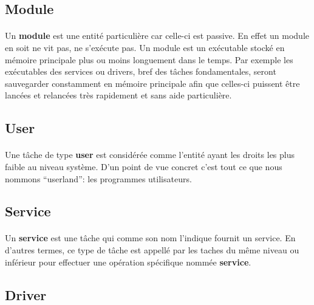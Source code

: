 \documentclass[10pt,a4wide]{article}
\begin{document}
\subsection{Module}

\paragraph{}

Un \textbf{module} est une entit\'e particuli\`ere car celle-ci est passive.
En effet un module en soit ne vit pas, ne s'ex\'ecute pas. Un module
est un ex\'ecutable stock\'e en m\'emoire principale plus ou moins longuement
dans le temps. Par exemple les ex\'ecutables des services ou drivers, bref
des t\^aches fondamentales, seront sauvegarder constamment en m\'emoire
principale afin que celles-ci puissent \^etre lanc\'ees et relanc\'ees
tr\`es rapidement et sans aide particuli\`ere.

\subsection{User}

\paragraph{}

Une t\^ache de type \textbf{user} est consid\'er\'ee comme l'entit\'e ayant
les droits les plus faible au niveau syst\`eme. D'un point de vue concret
c'est tout ce que nous nommons ``userland'': les programmes utilisateurs.

\subsection{Service}

\paragraph{}

Un \textbf{service} est une t\^ache qui comme son nom l'indique fournit
un service. En d'autres termes, ce type de t\^ache est appell\'e par
les taches du m\^eme niveau ou inf\'erieur pour effectuer une op\'eration
sp\'ecifique nomm\'ee \textbf{service}.

\subsection{Driver}
\end{document}
